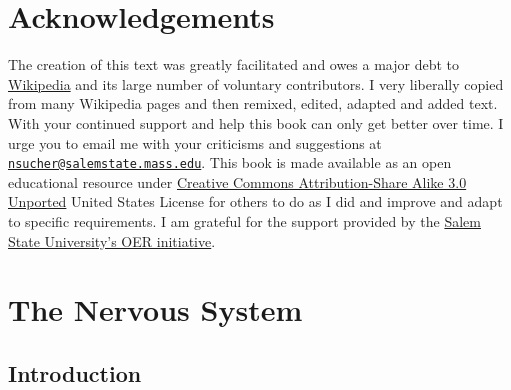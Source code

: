 




\frontmatter

\setcounter{page}{-1}


\maketitle

\setcounter{tocdepth}{1}
\tableofcontents

\clearpage

\listoftables
\listoffigures


\hypertarget{acknowledgements}{%
\chapter*{Acknowledgements}\label{acknowledgements}}

The creation of this text was greatly facilitated and owes a major debt to \href{https://www.wikipedia.org}{Wikipedia} and its large number of voluntary contributors. I very liberally copied from many Wikipedia pages and then remixed, edited, adapted and added text. With your continued support and help this book can only get better over time. I urge you to email me with your criticisms and suggestions at \href{mailto:nsucher@salemstate.mass.edu}{\nolinkurl{nsucher@salemstate.mass.edu}}. This book is made available as an open educational resource under \href{https://creativecommons.org/licenses/by-sa/3.0/deed.en}{Creative Commons Attribution-Share Alike 3.0 Unported} United States License for others to do as I did and improve and adapt to specific requirements. I am grateful for the support provided by the \href{}{Salem State University's OER initiative}.

\mainmatter

\hypertarget{the-nervous-system}{%
\chapter{The Nervous System}\label{the-nervous-system}}

\hypertarget{introduction}{%
\section{Introduction}\label{introduction}}

